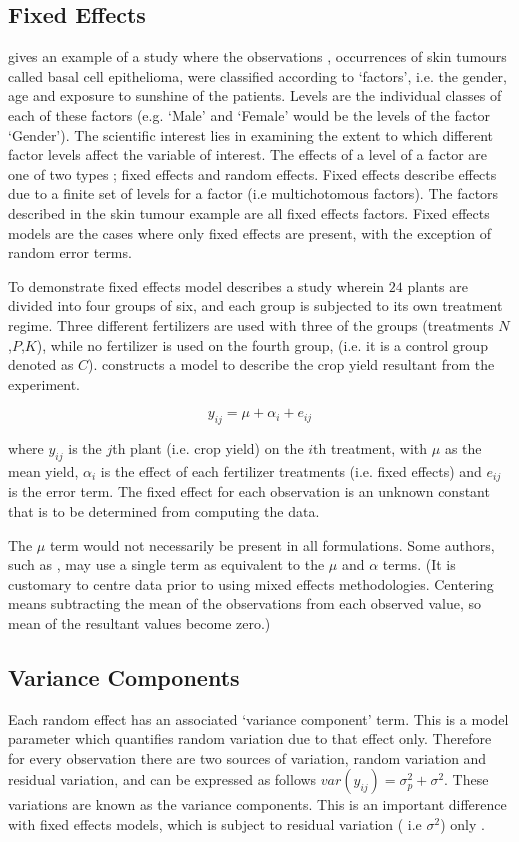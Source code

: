 \documentclass[12pt, a4paper]{report}
\theoremstyle{plain}
\theoremstyle{definition}
\theoremstyle{remark}
\begin{document}
\subsection{Fixed Effects}
\citet{McCullSearle} gives an example of a study where the
observations , occurrences of skin tumours called basal cell
epithelioma, were classified according to `factors', i.e. the
gender, age and exposure to sunshine of the patients. Levels are
the individual classes of each of these factors (e.g. `Male' and
`Female' would be the levels of the factor `Gender'). The
scientific interest lies in examining the extent to which
different factor levels affect the variable of interest. The
effects of a level of a factor are one of two types ; fixed
effects and random effects. Fixed effects describe effects due to
a finite set of levels for a factor (i.e multichotomous factors).
The factors described in the skin tumour example are all fixed
effects factors. Fixed effects models are the cases where only
fixed effects are present, with the exception of random error
terms.

To demonstrate fixed effects model \citet{Searle} describes a
study wherein $24$ plants are divided into four groups of six, and
each group is subjected to its own treatment regime. Three
different fertilizers are used with three of the groups
(treatments $N$,$P$,$K$), while no fertilizer is used on the
fourth group, (i.e. it is a control group denoted as $C$).
\citet{Searle} constructs a model to describe the crop yield
resultant from the experiment.

\begin{equation}
y_{ij} = \mu + \alpha_{i} + e_{ij}
\end{equation}

where $y_{ij}$ is the $j$th plant (i.e. crop yield) on the $i$th
treatment, with $\mu$ as the mean yield, $\alpha_{i}$ is the
effect of each fertilizer treatments (i.e. fixed effects) and
$e_{ij}$ is the error term. The fixed effect for each observation
is an unknown constant that is to be determined from computing the
data.

The $\mu$ term would not
necessarily be present in all formulations. Some authors, such as
\citet{Demi}, may use a single term as equivalent to the $\mu$ and
$\alpha$ terms. (It is customary to centre data prior to using
mixed effects methodologies. Centering means subtracting the mean
of the observations from each observed value, so mean of the
resultant values become zero.)

\subsection{Variance Components}
Each random effect has an associated `variance component' term.
This is a model parameter which quantifies random variation due to
that effect only. Therefore for every observation there are two
sources of variation, random variation and residual variation, and
can be expressed as follows $var(y_{ij})=\sigma^{2}_{p} +
\sigma^{2}$. These variations are known as the variance
components. This is an important difference with fixed effects
models, which is subject to residual variation ( i.e $\sigma^{2}$)
only \citep{BrownPrescott}.
\end{document}
